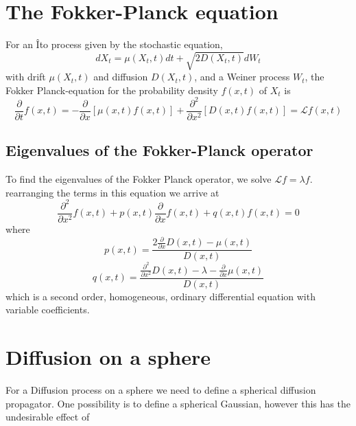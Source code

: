 \documentclass[12pt]{book}
\begin{document}
\section{The Fokker-Planck equation}\label{section_theFokkerPlanckEquation}
For an \^{I}to process given by the stochastic equation, 
\begin{equation*}
dX_t=\mu(X_t,t)dt+\sqrt{2D(X_t,t)}dW_t
\end{equation*}
with drift $\mu(X_t,t)$ and diffusion $D(X_t,t)$, and a Weiner process $W_t$, the Fokker Planck-equation for the probability density $f(x,t)$ of $X_t$ is 
\begin{equation*}
\frac{\partial}{\partial t}f(x,t)=-\frac{\partial}{\partial x}[\mu(x,t)f(x,t)]+\frac{\partial^2}{\partial x^2}[D(x,t)f(x,t)]=\mathcal{L}f(x,t)
\end{equation*}
\subsection{Eigenvalues of the Fokker-Planck operator }\label{subsection_eigenvaluesOfTheFokkerPlanckOperator}
To find the eigenvalues of the Fokker Planck operator, we solve $\mathcal{L}f = \lambda f$.
rearranging the terms in this equation we arrive at 
\begin{equation*}
\frac{\partial^2}{\partial x^2}f(x,t) +p(x,t)\frac{\partial}{\partial x}f(x,t) +q(x,t)f(x,t) = 0
\end{equation*}
where 
\begin{equation*}
p(x,t) = \frac{2\frac{\partial}{\partial x}D(x,t)-\mu(x,t)}{D(x,t)}
\end{equation*}
\begin{equation*}
q(x,t)=\frac{\frac{\partial^2}{\partial x^2}D(x,t)-\lambda-\frac{\partial}{\partial x}\mu(x,t)}{D(x,t)}
\end{equation*}
which is a second order, homogeneous, ordinary differential equation with variable coefficients. 

\section{Diffusion on a sphere}
For a Diffusion process on a sphere we need to define a spherical diffusion propagator. One possibility is to define a spherical Gaussian, however this has the undesirable effect of 

\end{document}
